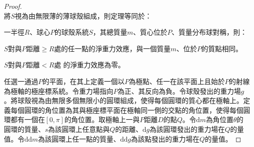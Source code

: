 \documentclass[a4paper,12pt]{article}
\begin{document}
\begin{proof}\mbox{}\\
將$S$視為由無限薄的薄球殼組成，則定理等同於：

一半徑$R$、球心$P$的球殼系統$S$，其總質量$m$、質心位於$P$、質量分布球對稱，則：
\ben
\item $S$對與$P$距離$\geq R$處的任一點的淨重力效應，與一個質量$m$、位於$P$的質點相同。
\item $S$對與$P$距離$<R$處
的淨重力效應為零。
\een

任選一通過$P$的平面，在其上定義一個以$P$為極點、任一在該平面上且始於$P$的射線為極軸的極座標系統。令重力場指向$P$為正、其反向為負。令球殼發出的重力場$g$。將球殼視為由無限多個無限小的圓環組成，使得每個圓環的質心都在極軸上。定義每個圓環的角位置為其與極座標平面在極軸同一側的交點的角位置，使得每個圓環都有一個在$[0,\pi]$的角位置。取極軸上一與$P$距離$D$的點$Q$。令$\mathrm{d}m$為角位置$\theta$的圓環的質量、$s$為該圓環上任意點與$Q$的距離、$\mathrm{d}g$為該圓環發出的重力場在$Q$的量值。令$\mathrm{d}\mathrm{d}m$為該圓環上任一點的質量、$\mathrm{d}\mathrm{d}g$為該點發出的重力場在$Q$的量值。


\end{proof}
\end{document}
